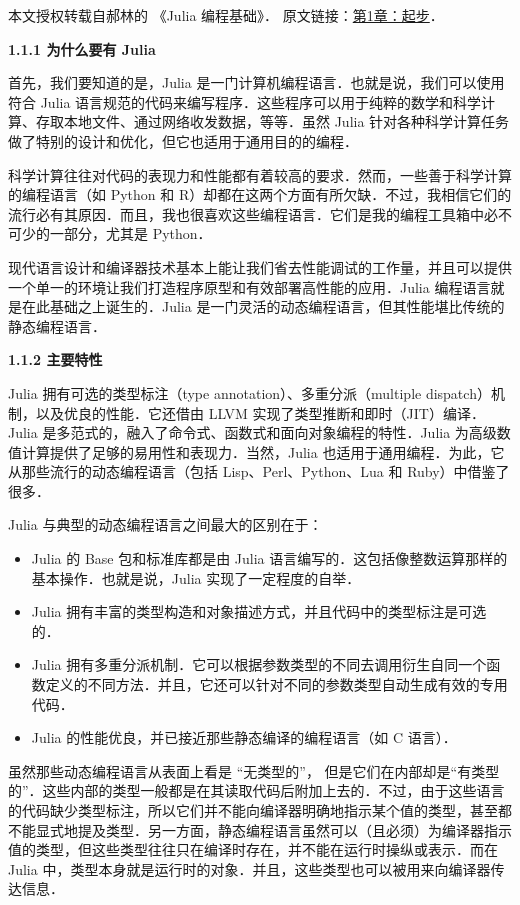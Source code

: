 
本文授权转载自郝林的 《Julia 编程基础》． 原文链接：\href{https://github.com/hyper0x/JuliaBasics/blob/master/book/ch01.md}{第1章：起步}．

\textbf{1.1.1 为什么要有 Julia}

首先，我们要知道的是，Julia 是一门计算机编程语言．也就是说，我们可以使用符合 Julia 语言规范的代码来编写程序．这些程序可以用于纯粹的数学和科学计算、存取本地文件、通过网络收发数据，等等．虽然 Julia 针对各种科学计算任务做了特别的设计和优化，但它也适用于通用目的的编程．

科学计算往往对代码的表现力和性能都有着较高的要求．然而，一些善于科学计算的编程语言（如 Python 和 R）却都在这两个方面有所欠缺．不过，我相信它们的流行必有其原因．而且，我也很喜欢这些编程语言．它们是我的编程工具箱中必不可少的一部分，尤其是 Python．

现代语言设计和编译器技术基本上能让我们省去性能调试的工作量，并且可以提供一个单一的环境让我们打造程序原型和有效部署高性能的应用．Julia 编程语言就是在此基础之上诞生的．Julia 是一门灵活的动态编程语言，但其性能堪比传统的静态编程语言．

\textbf{1.1.2 主要特性}

Julia 拥有可选的类型标注（type annotation）、多重分派（multiple dispatch）机制，以及优良的性能．它还借由 LLVM 实现了类型推断和即时（JIT）编译．Julia 是多范式的，融入了命令式、函数式和面向对象编程的特性．Julia 为高级数值计算提供了足够的易用性和表现力．当然，Julia 也适用于通用编程．为此，它从那些流行的动态编程语言（包括 Lisp、Perl、Python、Lua 和 Ruby）中借鉴了很多．

Julia 与典型的动态编程语言之间最大的区别在于：

\begin{itemize}
\item Julia 的 Base 包和标准库都是由 Julia 语言编写的．这包括像整数运算那样的基本操作．也就是说，Julia 实现了一定程度的自举．
\item Julia 拥有丰富的类型构造和对象描述方式，并且代码中的类型标注是可选的．
\item Julia 拥有多重分派机制．它可以根据参数类型的不同去调用衍生自同一个函数定义的不同方法．并且，它还可以针对不同的参数类型自动生成有效的专用代码．
\item Julia 的性能优良，并已接近那些静态编译的编程语言（如 C 语言）．
\end{itemize}

虽然那些动态编程语言从表面上看是 “无类型的”， 但是它们在内部却是“有类型的”．这些内部的类型一般都是在其读取代码后附加上去的．不过，由于这些语言的代码缺少类型标注，所以它们并不能向编译器明确地指示某个值的类型，甚至都不能显式地提及类型．另一方面，静态编程语言虽然可以（且必须）为编译器指示值的类型，但这些类型往往只在编译时存在，并不能在运行时操纵或表示．而在 Julia 中，类型本身就是运行时的对象．并且，这些类型也可以被用来向编译器传达信息．

